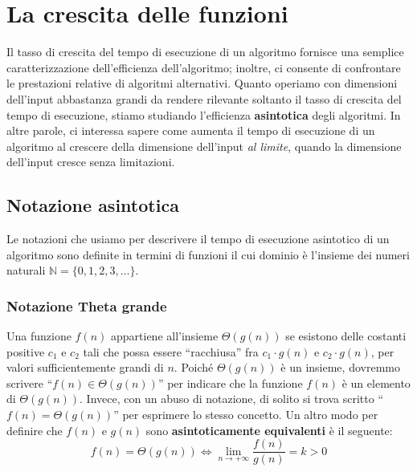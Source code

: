 \chapter{La crescita delle funzioni}

Il tasso di crescita del tempo di esecuzione di un algoritmo fornisce una semplice caratterizzazione dell'efficienza dell'algoritmo; inoltre, ci consente di confrontare le prestazioni relative di algoritmi alternativi.
Quanto operiamo con dimensioni dell'input abbastanza grandi da rendere rilevante soltanto il tasso di crescita del tempo di esecuzione, stiamo studiando l'efficienza \textbf{asintotica} degli algoritmi. In altre parole, ci interessa sapere come aumenta il tempo di esecuzione di un algoritmo al crescere della dimensione dell'input \textit{al limite}, quando la dimensione dell'input cresce senza limitazioni.

\section{Notazione asintotica}
Le notazioni che usiamo per descrivere il tempo di esecuzione  asintotico di un algoritmo sono definite in termini di funzioni il cui dominio è l'insieme dei numeri naturali $\mathbb{N}=\{0,1,2,3,\ldots\}$.

\subsection{Notazione Theta grande}


Una funzione $f(n)$ appartiene all'insieme $\Theta(g(n))$ se esistono delle costanti positive $c_{1}$ e $c_{2}$ tali che possa essere ``racchiusa'' fra $c_{1}\cdot g(n)$ e $c_{2}\cdot g(n)$, per valori sufficientemente grandi di $n$. Poiché $\Theta (g(n))$ è un insieme, dovremmo scrivere ``$f(n) \in \Theta(g(n))$'' per indicare che la funzione $f(n)$ è un elemento di $\Theta(g(n))$. Invece, con un abuso di notazione, di solito si trova scritto ``$f(n)=\Theta(g(n))$'' per esprimere lo stesso concetto. Un altro modo per definire che $f(n)$ e $g(n)$ sono \textbf{asintoticamente equivalenti} è il seguente:
\begin{equation}\label{eq:theta2}
	f(n)=\Theta(g(n)) \iff \lim_{n \to +\infty} \frac{f(n)}{g(n)}=k > 0
\end{equation}

